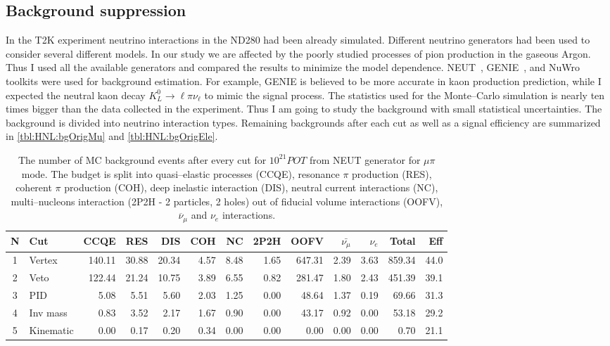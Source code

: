 \documentclass[../main.tex]{subfiles}
\begin{document}
\subsection{Background suppression}
\label{sec:HNL:bg}
In the T2K experiment neutrino interactions in the ND280 had been already simulated. Different neutrino generators had been used to consider several different models. In our study we are affected by the poorly studied processes of pion production in the gaseous Argon. Thus I used all the available generators and compared the results to minimize the model dependence. NEUT~\cite{Hayato2002}, GENIE~\cite{Andreopoulos2010}, and NuWro~\cite{Zmuda2015} toolkits were used for background estimation. For example, GENIE is believed to be more accurate in kaon production prediction, while I expected the neutral kaon decay $K^0_L\to\ell\pi\nu_\ell$ to mimic the signal process. The statistics used for the Monte--Carlo simulation is nearly ten times bigger than the data collected in the experiment. Thus I am going to study the background with small statistical uncertainties. The background is divided into neutrino interaction types. Remaining backgrounds after each cut as well as a signal efficiency are summarized in \autoref{tbl:HNL:bgOrigMu} and \autoref{tbl:HNL:bgOrigEle}.

\begin{table}[!ht]
\begin{tabular}{|c|l|r|r|r|r|r|r|r|r|r|r|r|}
  \hline
  N & Cut           &  CCQE   &  RES  &  DIS  &  COH  &  NC  &  2P2H  &  OOFV  &$\bar{\nu_{\mu}}$& $\nu_{e}$ & Total  & Eff\\
  \hline
  1 & Vertex        & 140.11  & 30.88 & 20.34 & 4.57  & 8.48 & 1.65   & 647.31 & 2.39            &  3.63     & 859.34 & 44.0 \\
  \hline
  2 & Veto          &  122.44  & 21.24 & 10.75 & 3.89  & 6.55 & 0.82   & 281.47 & 1.80            &  2.43     & 451.39 & 39.1 \\
  \hline
  3 & PID           & 5.08    & 5.51  & 5.60  & 2.03  & 1.25 & 0.00   & 48.64  & 1.37            &  0.19     &  69.66 & 31.3 \\
  \hline
  4 & Inv mass      & 0.83    & 3.52  & 2.17  & 1.67  & 0.90 & 0.00   & 43.17  & 0.92            &  0.00     &  53.18 & 29.2  \\
  \hline
  5 & Kinematic     & 0.00    & 0.17  & 0.20  & 0.34  & 0.00 & 0.00   & 0.00   & 0.00            &  0.00     &  0.70  & 21.1 \\
    \hline

\end{tabular}
\caption{The number of MC background events after every cut for $10^{21} POT$ from NEUT generator for $\mu\pi$ mode. The budget is split into quasi--elastic processes (CCQE), resonance $\pi$ production (RES), coherent $\pi$ production (COH), deep inelastic interaction (DIS), neutral current interactions (NC), multi--nucleons interaction (2P2H - 2 particles, 2 holes) out of fiducial volume interactions (OOFV), $\overline{\nu}_\mu$ and $\nu_e$ interactions.}
\label{tbl:HNL:bgOrigMu}
\end{table}
\end{document}
